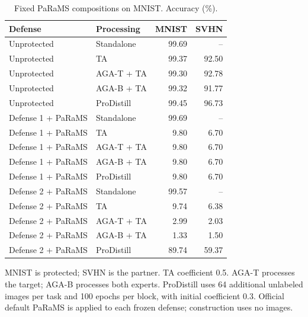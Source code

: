\begin{table}[t]
\centering\small
\setlength{\tabcolsep}{4pt}
\caption{Fixed PaRaMS compositions on MNIST. Accuracy (\%).}
\label{tab:params_composition}
\begin{tabular}{@{}llrr@{}}
\toprule
Defense & Processing & MNIST & SVHN \\
\midrule
Unprotected & Standalone & 99.69 & -- \\
Unprotected & TA & 99.37 & 92.50 \\
Unprotected & AGA-T + TA & 99.30 & 92.78 \\
Unprotected & AGA-B + TA & 99.32 & 91.77 \\
Unprotected & ProDistill & 99.45 & 96.73 \\
\midrule
Defense 1 + PaRaMS & Standalone & 99.69 & -- \\
Defense 1 + PaRaMS & TA & 9.80 & 6.70 \\
Defense 1 + PaRaMS & AGA-T + TA & 9.80 & 6.70 \\
Defense 1 + PaRaMS & AGA-B + TA & 9.80 & 6.70 \\
Defense 1 + PaRaMS & ProDistill & 9.80 & 6.70 \\
\midrule
Defense 2 + PaRaMS & Standalone & 99.57 & -- \\
Defense 2 + PaRaMS & TA & 9.74 & 6.38 \\
Defense 2 + PaRaMS & AGA-T + TA & 2.99 & 2.03 \\
Defense 2 + PaRaMS & AGA-B + TA & 1.33 & 1.50 \\
Defense 2 + PaRaMS & ProDistill & 89.74 & 59.37 \\
\bottomrule
\end{tabular}
\par\smallskip
\begin{minipage}{\textwidth}\footnotesize MNIST is protected; SVHN is the partner. TA coefficient 0.5. AGA-T processes the target; AGA-B processes both experts. ProDistill uses 64 additional unlabeled images per task and 100 epochs per block, with initial coefficient 0.3. Official default PaRaMS is applied to each frozen defense; construction uses no images.\end{minipage}
\end{table}
